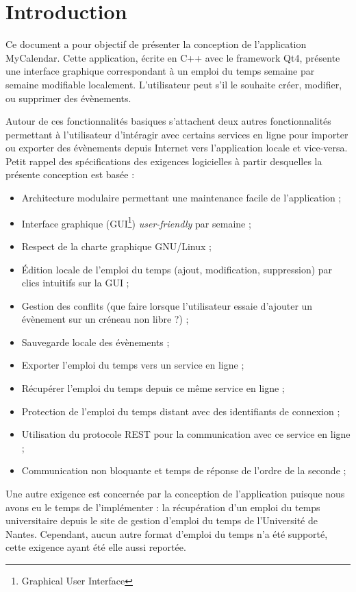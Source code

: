 \chapter*{Introduction}
	Ce document a pour objectif de présenter la conception de l'application MyCalendar. Cette application, écrite en C++ avec le framework Qt4, présente une interface graphique correspondant à un emploi du temps semaine par semaine modifiable localement. L'utilisateur peut s'il le souhaite créer, modifier, ou supprimer des évènements.

	Autour de ces fonctionnalités basiques s'attachent deux autres fonctionnalités permettant à l'utilisateur d'intéragir avec certains services en ligne pour importer ou exporter des évènements depuis Internet vers l'application locale et vice-versa.\\

	Petit rappel des spécifications des exigences logicielles à partir desquelles la présente conception est basée :
	\begin{itemize}
		\item Architecture modulaire permettant une maintenance facile de l'application ;
		\item Interface graphique (GUI\footnote{Graphical User Interface}) \emph{user-friendly} par semaine ;
		\item Respect de la charte graphique GNU/Linux ;
		\item Édition locale de l'emploi du temps (ajout, modification, suppression) par clics intuitifs sur la GUI ;
		\item Gestion des conflits (que faire lorsque l'utilisateur essaie d'ajouter un évènement sur un créneau non libre ?) ;
		\item Sauvegarde locale des évènements ;
		\item Exporter l'emploi du temps vers un service en ligne ;
		\item Récupérer l'emploi du temps depuis ce même service en ligne ;
		\item Protection de l'emploi du temps distant avec des identifiants de connexion ;
		\item Utilisation du protocole REST pour la communication avec ce service en ligne ;
		\item Communication non bloquante et temps de réponse de l'ordre de la seconde ;
	\end{itemize}
	\vspace{0.5cm} 
	Une autre exigence est concernée par la conception de l'application puisque nous avons eu le temps de l'implémenter : la récupération d'un emploi du temps universitaire depuis le site de gestion d'emploi du temps de l'Université de Nantes. Cependant, aucun autre format d'emploi du temps n'a été supporté, cette exigence ayant été elle aussi reportée.
		

